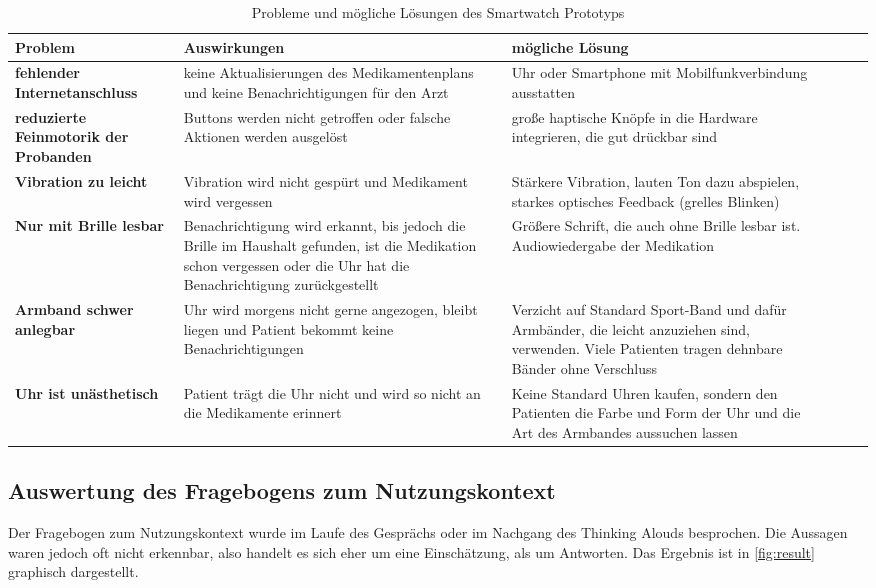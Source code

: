\begin{table}[]
\centering
\caption{Probleme und mögliche Lösungen des Smartwatch Prototyps}
\label{ch:problems}
\begin{tabular}{p{4cm} p{5cm} p{5cm}|l|l|l|}
\hline
 Problem  &Auswirkungen  &mögliche Lösung  \\ \hline
 \textbf{fehlender Internetanschluss}  &keine Aktualisierungen des Medikamentenplans und keine Benachrichtigungen für den Arzt &Uhr oder Smartphone mit Mobilfunkverbindung ausstatten  \\
 \textbf{reduzierte Feinmotorik der Probanden} &Buttons werden nicht getroffen oder falsche Aktionen werden ausgelöst  &große haptische Knöpfe in die Hardware integrieren, die gut drückbar sind  \\
 \textbf{Vibration zu leicht}&Vibration wird nicht gespürt und Medikament wird vergessen  &Stärkere Vibration, lauten Ton dazu abspielen, starkes optisches Feedback (grelles Blinken)   \\
 \textbf{Nur mit Brille lesbar} &Benachrichtigung wird erkannt, bis jedoch die Brille im Haushalt gefunden, ist die Medikation schon vergessen oder die Uhr hat die Benachrichtigung zurückgestellt  &Größere Schrift, die auch ohne Brille lesbar ist. Audiowiedergabe der Medikation  \\
 \textbf{Armband schwer anlegbar}&Uhr wird morgens nicht gerne angezogen,  bleibt liegen und Patient bekommt keine Benachrichtigungen  &Verzicht auf Standard Sport-Band und dafür Armbänder, die leicht anzuziehen sind, verwenden. Viele Patienten tragen dehnbare Bänder ohne Verschluss \\
 \textbf{Uhr ist unästhetisch}&Patient trägt die Uhr nicht und wird so nicht an die Medikamente erinnert  &Keine Standard Uhren kaufen, sondern den Patienten die Farbe und Form der Uhr und die Art des Armbandes aussuchen lassen  \\ \hline
\end{tabular}
\end{table}
\subsection{Auswertung des Fragebogens zum Nutzungskontext}
Der Fragebogen zum Nutzungskontext wurde im Laufe des Gesprächs oder im Nachgang des Thinking Alouds besprochen. Die Aussagen waren jedoch oft nicht erkennbar, also handelt es sich eher um eine Einschätzung, als um Antworten. Das Ergebnis ist in \ref{fig:result} graphisch dargestellt.

